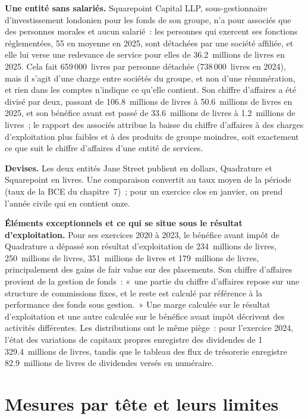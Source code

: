 \textbf{Une entité sans salariés.} Squarepoint Capital LLP, sous-gestionnaire d'investissement londonien pour les fonds de son groupe,
n'a pour associés que des personnes morales et aucun salarié~: les personnes qui exercent ses fonctions réglementées, 55 en moyenne en 2025, sont
détachées par une société affiliée, et elle lui verse une redevance de service pour elles de 36.2~millions de livres en 2025. Cela fait
659\,000~livres par personne détachée (738\,000~livres en 2024), mais il s'agit d'une charge entre sociétés du groupe, et non d'une rémunération, et
rien dans les comptes n'indique ce qu'elle contient. Son chiffre d'affaires a été divisé par deux, passant de 106.8~millions de livres à 50.6~millions de livres en
2025, et son bénéfice avant  est passé de 33.6~millions de livres à 1.2~millions de livres~; le rapport des
associés attribue la baisse du chiffre d'affaires à des charges d'exploitation plus faibles et à des produits de groupe moindres, soit exactement ce que suit le chiffre d'affaires
d'une entité de services.

\textbf{Devises.} Les deux entités Jane Street publient en dollars, Quadrature et Squarepoint en livres. Une comparaison
convertit au taux moyen de la période (taux de la BCE du chapitre~7)~; pour un exercice clos en janvier, on prend
l'année civile qui en contient onze.

\textbf{Éléments exceptionnels et ce qui se situe sous le résultat d'exploitation.} Pour ses exercices 2020 à 2023, le bénéfice avant
impôt de Quadrature a dépassé son résultat d'exploitation de 234~millions de livres, 250~millions de livres, 351~millions de livres et 179~millions de livres,
principalement des gains de fair value sur des placements. Son chiffre d'affaires provient de la gestion de fonds~: «~une partie du chiffre d'affaires repose sur une structure de commissions
fixes, et le reste est calculé par référence à la performance des fonds sous gestion.~»
Une marge calculée sur le résultat d'exploitation et une autre calculée sur le bénéfice avant impôt décrivent des activités différentes. Les distributions ont
le même piège~: pour l'exercice 2024, l'état des variations de capitaux propres enregistre des dividendes de 1\,329.4~millions de livres, tandis que le
tableau des flux de trésorerie enregistre 82.9~millions de livres de dividendes versés en numéraire.

\section{Mesures par tête et leurs limites}


